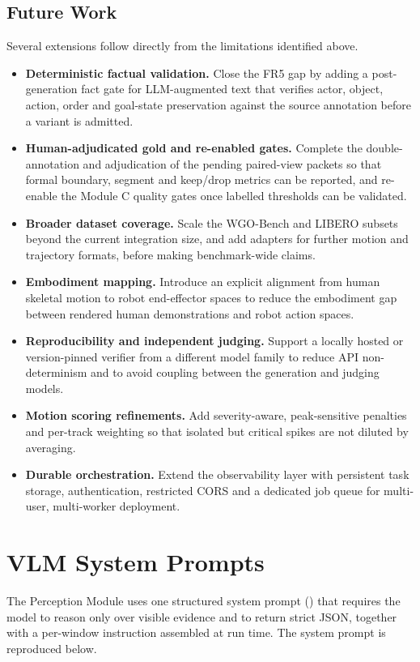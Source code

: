 \documentclass[11pt,oneside]{report}
\begin{document}
\section{Future Work}
Several extensions follow directly from the limitations identified above.

\begin{itemize}
    \item \textbf{Deterministic factual validation.} Close the FR5 gap by adding
    a post-generation fact gate for LLM-augmented text that verifies actor,
    object, action, order and goal-state preservation against the source
    annotation before a variant is admitted.
    \item \textbf{Human-adjudicated gold and re-enabled gates.} Complete the
    double-annotation and adjudication of the pending paired-view packets so that
    formal boundary, segment and keep/drop metrics can be reported, and re-enable
    the Module C quality gates once labelled thresholds can be validated.
    \item \textbf{Broader dataset coverage.} Scale the WGO-Bench and LIBERO
    subsets beyond the current integration size, and add adapters for further
    motion and trajectory formats, before making benchmark-wide claims.
    \item \textbf{Embodiment mapping.} Introduce an explicit alignment from human
    skeletal motion to robot end-effector spaces to reduce the embodiment gap
    between rendered human demonstrations and robot action spaces.
    \item \textbf{Reproducibility and independent judging.} Support a locally
    hosted or version-pinned verifier from a different model family to reduce API
    non-determinism and to avoid coupling between the generation and judging
    models.
    \item \textbf{Motion scoring refinements.} Add severity-aware, peak-sensitive
    penalties and per-track weighting so that isolated but critical spikes are not
    diluted by averaging.
    \item \textbf{Durable orchestration.} Extend the observability layer with
    persistent task storage, authentication, restricted CORS and a dedicated job
    queue for multi-user, multi-worker deployment.
\end{itemize}




\appendix
\chapter{VLM System Prompts}
The Perception Module uses one structured system prompt
() that requires the model to reason only over visible
evidence and to return strict JSON, together with a per-window instruction
assembled at run time. The system prompt is reproduced below.
\end{document}
